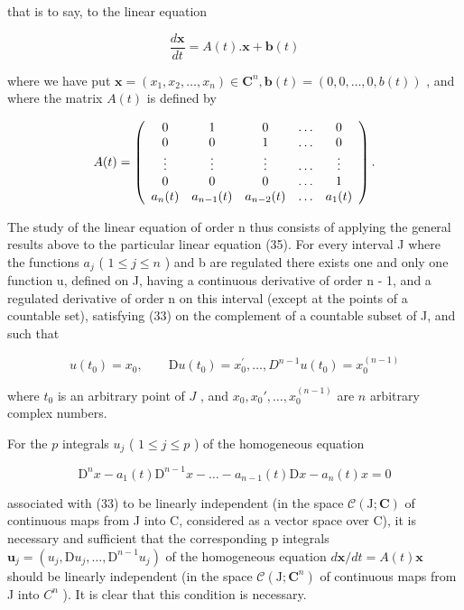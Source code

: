 that is to say, to the linear equation

\[
\frac {d \mathbf {x}}{d t} = A (t). \mathbf {x} + \mathbf {b} (t)\tag{35}
\]

where we have put \(\mathbf{x}=(x_{1},x_{2},\ldots,x_{n})\in\mathbf{C}^{n},\mathbf{b}(t)=(0,0,\ldots,0,b(t))\) , and where the matrix \(A(t)\) is defined by

\[
A (t) = \left( \begin{array}{c c c c c} 0 & 1 & 0 & \ldots & 0 \\ 0 & 0 & 1 & \ldots & 0 \\ \vdots & \vdots & \vdots & \ldots & \vdots \\ 0 & 0 & 0 & \ldots & 1 \\ a _ {n} (t) & a _ {n - 1} (t) & a _ {n - 2} (t) & \ldots & a _ {1} (t) \end{array} \right).
\]

The study of the linear equation of order n thus consists of applying the general results above to the particular linear equation (35). For every interval J where the functions \(a_{j}\) ( \(1 \leqslant j \leqslant n\) ) and b are regulated there exists one and only one function u, defined on J, having a continuous derivative of order n - 1, and a regulated derivative of order n on this interval (except at the points of a countable set), satisfying (33) on the complement of a countable subset of J, and such that

\[
u (t _ {0}) = x _ {0}, \qquad \mathrm{D} u (t _ {0}) = x _ {0} ^ {\prime}, \dots , D ^ {n - 1} u (t _ {0}) = x _ {0} ^ {(n - 1)}\tag{36}
\]

where \(t_0\) is an arbitrary point of \(J\) , and \(x_0, x_0', \ldots, x_0^{(n-1)}\) are \(n\) arbitrary complex numbers.

For the \(p\) integrals \(u_{j}\) ( \(1 \leqslant j \leqslant p\) ) of the homogeneous equation

\[
\mathrm{D} ^ {n} x - a _ {1} (t) \mathrm{D} ^ {n - 1} x - \dots - a _ {n - 1} (t) \mathrm{D} x - a _ {n} (t) x = 0\tag{37}
\]

associated with (33) to be linearly independent (in the space \(\mathcal{C}(\mathrm{J};\mathbf{C})\) of continuous maps from J into C, considered as a vector space over C), it is necessary and sufficient that the corresponding p integrals \(\mathbf{u}_{j}=(u_{j},\mathrm{D}u_{j},\ldots,\mathrm{D}^{n-1}u_{j})\) of the homogeneous equation \(d\mathbf{x}/dt=A(t)\mathbf{x}\) should be linearly independent (in the space \(\mathcal{C}(\mathrm{J};\mathbf{C}^{n})\) of continuous maps from J into \(C^{n}\) ). It is clear that this condition is necessary.

